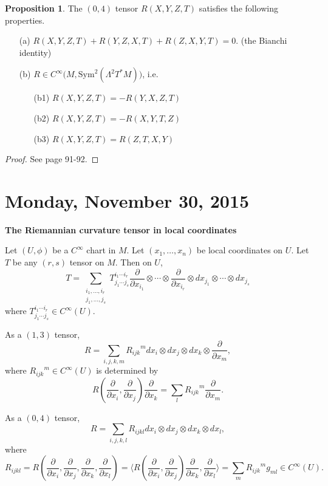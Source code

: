 \documentclass{amsart}
\numberwithin{equation}{section}
\theoremstyle{definition}
\theoremstyle{theorem}
\newtheorem{proposition}[definition]{Proposition}
\begin{document}
\begin{proposition}\label{Rsymmetry}
The $(0,4)$ tensor $R(X,Y,Z,T)$ satisfies the following properties.
\begin{enumerate}
\item[(a)] $R(X,Y,Z,T) + R(Y,Z,X,T) + R(Z,X,Y, T) = 0$.  (the Bianchi identity)
\item[(b)] $R\in C^\infty\big(M, \mathrm{Sym}^2(\Lambda^2 T^*M)\big)$, i.e.
\begin{enumerate}
\item[(b1)] $R(X,Y,Z,T) = -R(Y,X,Z,T)$
\item[(b2)] $R(X,Y,Z,T) = -R(X,Y,T,Z)$
\item[(b3)] $R(X,Y,Z,T) = R(Z,T,X,Y)$ 
\end{enumerate}
\end{enumerate}
\end{proposition}

\begin{proof} See \cite{dC} page 91-92.
\end{proof}




\section{Monday, November 30, 2015}

\noindent
{\bf \large The Riemannian curvature tensor in local coordinates}

Let $(U,\phi)$ be a $C^\infty$ chart in $M$. Let $(x_1,\ldots,x_n)$ be local coordinates
on $U$. Let $T$ be any $(r,s)$ tensor on $M$. Then on $U$,
$$
T=\sum_{\substack{i_1,\ldots, i_r\\ j_1,\ldots, j_s}} T^{i_1 \cdots i_r}_{j_1\cdots j_s} 
\frac{\partial}{\partial x_{i_1}} \otimes \cdots \otimes \frac{\partial}{\partial x_{i_r}}
\otimes dx_{j_1}\otimes \cdots \otimes dx_{j_s}
$$
where $T^{i_1\cdots i_r}_{j_1\cdots j_s} \in C^\infty(U)$.

As a $(1,3)$ tensor,
$$
R = \sum_{i,j,k,m} {R_{ijk}}^m  dx_i\otimes dx_j\otimes dx_k\otimes \frac{\partial}{\partial x_m},
$$
where ${R_{ijk}}^m \in C^\infty(U)$ is determined by
$$
R(\frac{\partial}{\partial x_i}, \frac{\partial}{\partial x_j}) \frac{\partial}{\partial x_k}
=\sum_l {R_{ijk}}^m \frac{\partial}{\partial x_m}.
$$

As a $(0,4)$ tensor,
$$
R =\sum_{i,j,k,l} R_{ijkl} dx_i\otimes dx_j\otimes dx_k\otimes dx_l,
$$
where 
$$
R_{ijkl}= R(\frac{\partial}{\partial x_i}, \frac{\partial}{\partial x_j},
\frac{\partial}{\partial x_k}, \frac{\partial}{\partial x_l}) 
= \langle R(\frac{\partial}{\partial x_i}, \frac{\partial}{\partial x_j})\frac{\partial}{\partial x_k},\frac{\partial}
{\partial x_l}\rangle = \sum_m {R_{ijk}}^m g_{ml} \in C^\infty(U). 
$$
\end{document}
